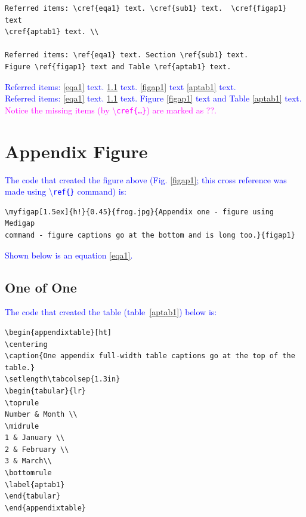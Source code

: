 \documentclass[phd]{ndsu-thesis-2022}
\newcommand\italk[1]{\textcolor{blue}{#1}}  %
\newcommand\cmd[1]{\textbackslash\texttt{#1}}  %
\begin{document}
{\singlespacing
\begin{verbatim}
Referred items: \cref{eqa1} text. \cref{sub1} text.  \cref{figap1} text 
\cref{aptab1} text. \\

Referred items: \ref{eqa1} text. Section \ref{sub1} text.  
Figure \ref{figap1} text and Table \ref{aptab1} text.
\end{verbatim}
}

\italk{Referred items: \cref{eqa1} text. \cref{sub1} text.  \cref{figap1} text \cref{aptab1} text. \\
Referred items: \ref{eqa1} text. \ref{sub1} text.  Figure \ref{figap1} text and Table \ref{aptab1} text.
\\ \textcolor{magenta}{Notice the missing items (by \cmd{cref\{\ldots\}}) are marked as ??.}}

\section{Appendix Figure}


\italk{The code that created the figure above (Fig. \ref{figap1}; this cross reference was made using \cmd{ref\{\}} command) is:}

{\onehalfspacing
\begin{verbatim}
\myfigap[1.5ex]{h!}{0.45}{frog.jpg}{Appendix one - figure using Medigap 
command - figure captions go at the bottom and is long too.}{figap1}
\end{verbatim}
}

\italk{Shown below is an equation \cref{eqa1}. } 


\subsection{One of One}
\label{sub1}
\kant[2]

\italk{The code that created the table (table~\ref{aptab1}) below is:}

{\onehalfspacing
\begin{verbatim}
\begin{appendixtable}[ht]
\centering
\caption{One appendix full-width table captions go at the top of the table.}
\setlength\tabcolsep{1.3in}
\begin{tabular}{lr}
\toprule
Number & Month \\
\midrule
1 & January \\
2 & February \\
3 & March\\
\bottomrule
\label{aptab1}
\end{tabular}
\end{appendixtable}
\end{verbatim}
}
\end{document}
